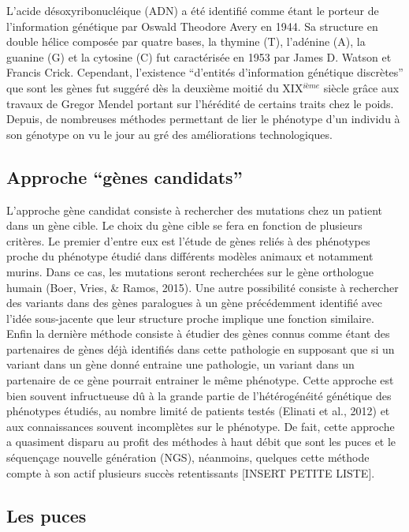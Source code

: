 \documentclass[12pt,twoside]{reedthesis}
\theoremstyle{definition}
\theoremstyle{definition}
\theoremstyle{remark}
\begin{document}
  L'acide désoxyribonucléique (ADN) a été identifié comme étant le porteur
  de l'information génétique par Oswald Theodore Avery en 1944. Sa
  structure en double hélice composée par quatre bases, la thymine (T),
  l'adénine (A), la guanine (G) et la cytosine (C) fut caractérisée en
  1953 par James D. Watson et Francis Crick. Cependant, l'existence
  ``d'entités d'information génétique discrètes'' que sont les gènes fut
  suggéré dès la deuxième moitié du XIX\(^{ième}\) siècle grâce aux
  travaux de Gregor Mendel portant sur l'hérédité de certains traits chez
  le poids. Depuis, de nombreuses méthodes permettant de lier le phénotype
  d'un individu à son génotype on vu le jour au gré des améliorations
  technologiques.
  
  \subsection{\texorpdfstring{Approche ``gènes
  candidats''}{Approche gènes candidats}}\label{approche-genes-candidats}
  
  L'approche gène candidat consiste à rechercher des mutations chez un
  patient dans un gène cible. Le choix du gène cible se fera en fonction
  de plusieurs critères. Le premier d'entre eux est l'étude de gènes
  reliés à des phénotypes proche du phénotype étudié dans différents
  modèles animaux et notamment murins. Dans ce cas, les mutations seront
  recherchées sur le gène orthologue humain (Boer, Vries, \& Ramos, 2015).
  Une autre possibilité consiste à rechercher des variants dans des gènes
  paralogues à un gène précédemment identifié avec l'idée sous-jacente que
  leur structure proche implique une fonction similaire. Enfin la dernière
  méthode consiste à étudier des gènes connus comme étant des partenaires
  de gènes déjà identifiés dans cette pathologie en supposant que si un
  variant dans un gène donné entraine une pathologie, un variant dans un
  partenaire de ce gène pourrait entrainer le même phénotype. Cette
  approche est bien souvent infructueuse dû à la grande partie de
  l'hétérogénéité génétique des phénotypes étudiés, au nombre limité de
  patients testés (Elinati et al., 2012) et aux connaissances souvent
  incomplètes sur le phénotype. De fait, cette approche a quasiment
  disparu au profit des méthodes à haut débit que sont les puces et le
  séquençage nouvelle génération (NGS), néanmoins, quelques cette méthode
  compte à son actif plusieurs succès retentissants {[}INSERT PETITE
  LISTE{]}.
  
  \subsection{Les puces}\label{les-puces}
  
\end{document}
